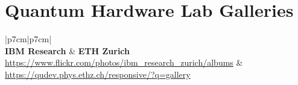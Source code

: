 \chapter{\LARGE{Quantum Hardware Lab Galleries}}

\centering

\LARGE\begin{tabular}{ |p{7cm}|p{7cm}| }
 \hline
  \\
 \hline
\textbf{\Large{IBM Research}} & 
\textbf{\Large{ETH Zurich}} \\ {\normalsize\url{https://www.flickr.com/photos/ibm_research_zurich/albums}}  &  {\normalsize\url{https://qudev.phys.ethz.ch/responsive/?q=gallery}} \\
\hline
{} \\
\hline
\end{tabular}
